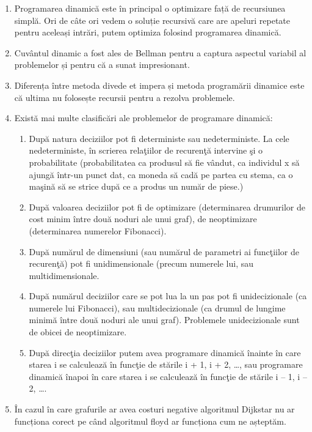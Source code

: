 \documentclass[14pt,a4paper]{extreport}
\begin{document}
\begin{enumerate}
	\item Programarea dinamică este în principal o optimizare față de recursiunea simplă. Ori de câte ori vedem o soluție recursivă care are apeluri repetate pentru aceleași intrări, putem optimiza folosind programarea dinamică. 
	\item Cuvântul dinamic a fost ales de Bellman pentru a captura aspectul variabil al problemelor și pentru că a sunat impresionant.
	\item Diferența între metoda divede et impera și metoda programării dinamice este că ultima nu folosește recursii pentru a rezolva problemele.
	\item Există mai multe clasificări ale problemelor de programare dinamică: 
	 \begin{enumerate}
		 \item După  natura deciziilor pot fi deterministe sau nedeterministe.  La cele nedeterministe, în scrierea relaţiilor de recurenţă intervine şi o probabilitate (probabilitatea ca produsul să fie vândut, ca individul x să ajungă într-un punct dat, ca moneda să cadă pe partea cu stema, ca o maşină să se strice după ce a produs un număr de piese.) 
		 \item După valoarea deciziilor pot fi de optimizare (determinarea drumurilor de cost minim între două noduri ale unui graf), de neoptimizare (determinarea numerelor Fibonacci).   
		 \item După numărul de dimensiuni (sau numărul de parametri ai funcţiilor de recurenţă) pot fi unidimensionale (precum numerele lui, sau multidimensionale. 
		 \item După numărul deciziilor care se pot lua la un pas pot fi unidecizionale (ca numerele lui Fibonacci), sau multidecizionale (ca drumul de lungime minimă între două noduri ale unui graf).  Problemele unidecizionale sunt de obicei de neoptimizare. 
		 \item După direcţia deciziilor putem avea programare dinamică înainte în care starea i se calculează în funcţie de stările  i + 1, i + 2, …, sau programare dinamică înapoi în care starea i  se calculează în funcţie de stările i – 1, i – 2, ….   
	 \end{enumerate}
 \item În cazul în care grafurile ar avea costuri negative algoritmul Dijkstar nu ar funcționa corect pe când algoritmul floyd ar funcționa cum ne așteptăm.
\end{enumerate}
\end{document}
